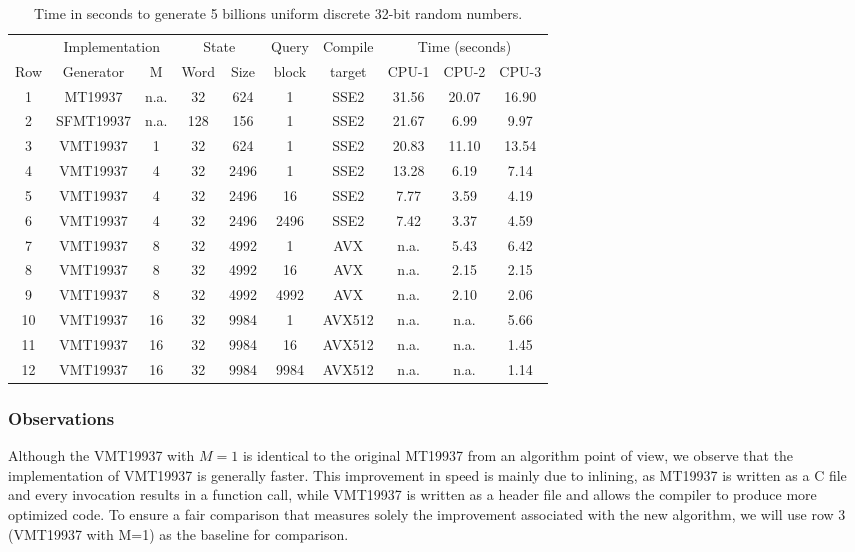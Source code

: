 \documentclass[preprint,1p,times]{elsarticle}
\begin{document}
\begin{table}
\begin{tabular}{c|c| c|c| c| c| c| c|c|c|} 
\cline{2-10}
 &  \multicolumn{2}{c|}{Implementation}   & \multicolumn{2}{c|}{State} & Query & Compile & \multicolumn{3}{c|}{Time (seconds)} \\
 \cline{1-5} \cline{8-10} \multicolumn{1}{|c|}{Row}
  & Generator  & M   & Word & Size & block & target & CPU-1 & CPU-2 & CPU-3 \\
 \hline \multicolumn{1}{|c|}{1}
 & MT19937         &  n.a. & 32   & 624 & 1     & SSE2    & 31.56 & 20.07 & 16.90 \\ 
 \hline \multicolumn{1}{|c|}{2}
 & SFMT19937       &  n.a. & 128  & 156 & 1     & SSE2    & 21.67 & 6.99 & 9.97 \\
 \hline \multicolumn{1}{|c|}{3}
 & VMT19937    & 1   & 32   & 624 & 1     & SSE2    & 20.83  & 11.10 & 13.54 \\
 \hline \multicolumn{1}{|c|}{4}
 & VMT19937    & 4   & 32  & 2496 & 1     & SSE2    & 13.28  & 6.19 & 7.14 \\
 \hline \multicolumn{1}{|c|}{5}
 & VMT19937    & 4   & 32  & 2496 & 16    & SSE2    &  7.77  & 3.59 & 4.19 \\
 \hline \multicolumn{1}{|c|}{6}
 & VMT19937    & 4   & 32  & 2496 & 2496  & SSE2    &  7.42  & 3.37 & 4.59 \\
 \hline \multicolumn{1}{|c|}{7}
 & VMT19937     & 8   & 32  & 4992 & 1    & AVX     & n.a.   &5.43  & 6.42 \\
 \hline \multicolumn{1}{|c|}{8}
 & VMT19937     & 8   & 32  & 4992 & 16   & AVX     & n.a.   &2.15  & 2.15 \\
 \hline \multicolumn{1}{|c|}{9}
 & VMT19937     & 8   & 32  & 4992 & 4992 & AVX     & n.a.   &2.10 & 2.06 \\
 \hline \multicolumn{1}{|c|}{10}
 & VMT19937   &  16   & 32  & 9984 & 1    & AVX512  & n.a.   & n.a. & 5.66 \\
 \hline \multicolumn{1}{|c|}{11}
 & VMT19937   &  16 & 32    & 9984 & 16   & AVX512  & n.a.   & n.a. & 1.45 \\
 \hline \multicolumn{1}{|c|}{12}
 & VMT19937   &  16  & 32    & 9984 & 9984 & AVX512  & n.a.   & n.a. & 1.14 \\
 \hline
\end{tabular}
\caption{\label{tab:results} Time in seconds to generate 5 billions uniform discrete 32-bit random numbers.}
\end{table}

\subsubsection{Observations}
\noindent Although the VMT19937 with $M=1$ is identical to the original MT19937 from an algorithm point of view, we observe that the implementation of VMT19937 is generally faster. This improvement in speed is mainly due to inlining, as MT19937 is written as a C file and every invocation results in a function call, while VMT19937 is written as a header file and allows the compiler to produce more optimized code. To ensure a fair comparison that measures solely the improvement associated with the new algorithm, we will use row 3 (VMT19937 with M=1) as the baseline for comparison.
\end{document}
